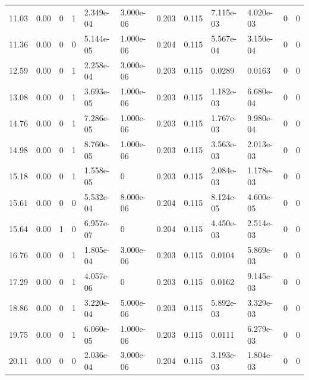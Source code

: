 \documentclass[preview]{standalone}
\begin{document}
{{\begin{tabular}{L{1.2cm}C{1.2cm} C{0.3cm}C{0.5cm} C{1.4cm}C{1.4cm} C{1.4cm}C{1.4cm} C{1.6cm}C{1.6cm} C{1.6cm}C{1.6cm}}
  11.03  &  0.00  & 0     &  1 &  2.349e-04  & 3.000e-06  &  0.203&   0.115& 7.115e-03 & 4.020e-03   &  0 & 0  \\ 
  11.36  &  0.00  & 0     &  0 &  5.144e-05  & 1.000e-06  &  0.204&   0.115& 5.567e-04 & 3.150e-04   &  0 & 0  \\ 
  12.59  &  0.00  & 0     &  1 &  2.258e-04  & 3.000e-06  &  0.203&   0.115& 0.0289 & 0.0163   &  0 & 0  \\ 
  13.08  &  0.00  & 0     &  1 &  3.693e-05  & 1.000e-06  &  0.203&   0.115& 1.182e-03 & 6.680e-04   &  0 & 0  \\ 
  14.76  &  0.00  & 0     &  1 &  7.286e-05  & 1.000e-06  &  0.203&   0.115& 1.767e-03 & 9.980e-04   &  0 & 0  \\ 
  14.98  &  0.00  & 0     &  1 &  8.760e-05  & 1.000e-06  &  0.203&   0.115& 3.563e-03 & 2.013e-03   &  0 & 0  \\ 
  15.18  &  0.00  & 0     &  1 &  1.558e-05  & 0  &  0.203&   0.115& 2.084e-03 & 1.178e-03   &  0 & 0  \\ 
  15.61  &  0.00  & 0     &  0 &  5.532e-04  & 8.000e-06  &  0.204&   0.115& 8.124e-05 & 4.600e-05   &  0 & 0  \\ 
  15.64  &  0.00  & 1     &  0 &  6.957e-07  & 0  &  0.204&   0.115& 4.450e-03 & 2.514e-03   &  0 & 0  \\ 
  16.76  &  0.00  & 0     &  1 &  1.805e-04  & 3.000e-06  &  0.203&   0.115& 0.0104 & 5.869e-03   &  0 & 0  \\ 
  17.29  &  0.00  & 0     &  1 &  4.057e-06  & 0  &  0.203&   0.115& 0.0162 & 9.145e-03   &  0 & 0  \\ 
  18.86  &  0.00  & 0     &  1 &  3.220e-04  & 5.000e-06  &  0.203&   0.115& 5.892e-03 & 3.329e-03   &  0 & 0  \\ 
  19.75  &  0.00  & 0     &  1 &  6.060e-05  & 1.000e-06  &  0.203&   0.115& 0.0111 & 6.279e-03   &  0 & 0  \\ 
  20.11  &  0.00  & 0     &  0 &  2.036e-04  & 3.000e-06  &  0.204&   0.115& 3.193e-03 & 1.804e-03   &  0 & 0  \\ 
\hline 
\end{tabular} 

}}
\end{document}
